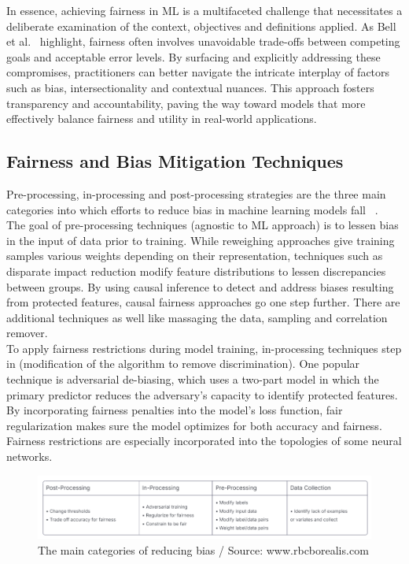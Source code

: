 \documentclass[runningheads]{llncs}
\begin{document}
In essence, achieving fairness in ML is a multifaceted challenge that necessitates a deliberate examination of the context, objectives and definitions applied. As Bell et al.~\cite{bell2023fairness} highlight, fairness often involves unavoidable trade-offs between competing goals and acceptable error levels. By surfacing and explicitly addressing these compromises, practitioners can better navigate the intricate interplay of factors such as bias, intersectionality and contextual nuances. This approach fosters transparency and accountability, paving the way toward models that more effectively balance fairness and utility in real-world applications.

\subsection{Fairness and Bias Mitigation Techniques}
Pre-processing, in-processing and post-processing strategies are the three main categories into which efforts to reduce bias in machine learning models fall ~\cite{prince2019}.\\

The goal of pre-processing techniques (agnostic to ML approach) is to lessen bias in the input of data prior to training. While reweighing approaches give training samples various weights depending on their representation, techniques such as disparate impact reduction modify feature distributions to lessen discrepancies between groups. By using causal inference to detect and address biases resulting from protected features, causal fairness approaches go one step further. There are additional techniques as well like massaging the data, sampling and correlation remover.\\

To apply fairness restrictions during model training, in-processing techniques step in (modification of the algorithm to remove discrimination). One popular technique is adversarial de-biasing, which uses a two-part model in which the primary predictor reduces the adversary's capacity to identify protected features. By incorporating fairness penalties into the model's loss function, fair regularization makes sure the model optimizes for both accuracy and fairness. Fairness restrictions are especially incorporated into the topologies of some neural networks. ~\cite{voria2024}\\

\begin{figure}
\includegraphics[width=\textwidth]{images/categories.png}
\caption{The main categories of reducing bias / Source: www.rbcborealis.com} \label{categories}
\end{figure}
\end{document}
